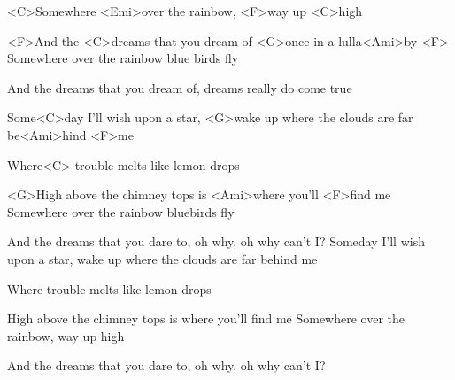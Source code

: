 

\zs

<C>Somewhere <Emi>over the rainbow, <F>way up <C>high

<F>And the <C>dreams that you dream of <G>once in a lulla<Ami>by <F> 
\ks
\zs
Somewhere over the rainbow blue birds fly

And the dreams that you dream of, dreams really do come true
\ks
\zr

Some<C>day I'll wish upon a star,
<G>wake up where the clouds are far be<Ami>hind <F>me

Where<C> trouble melts like lemon drops

<G>High above the chimney tops is <Ami>where you'll <F>find me
\kr
\zs
Somewhere over the rainbow bluebirds fly

And the dreams that you dare to, oh why, oh why can't I?
\ks
\zr
Someday I'll wish upon a star, wake up where the clouds are far behind me

Where trouble melts like lemon drops

High above the chimney tops is where you'll find me
\kr
\zs
Somewhere over the rainbow, way up high

And the dreams that you dare to, oh why, oh why can't I?
\ks

\kp
